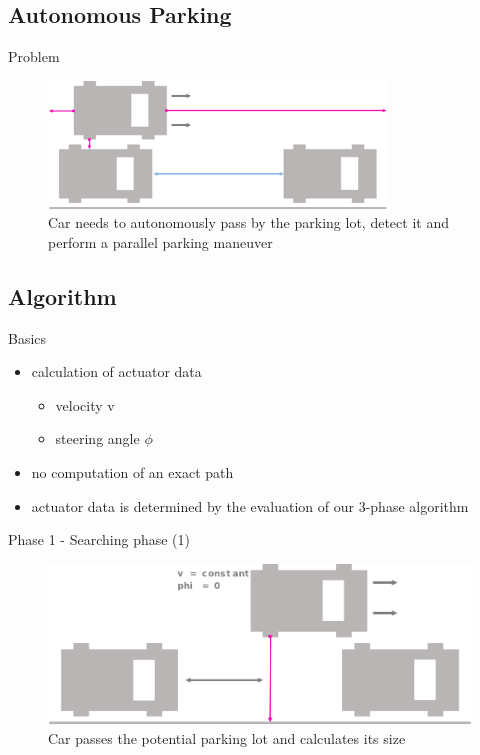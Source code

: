\documentclass[aspectratio=169]{beamer}
\begin{document}
  \subsection{Autonomous Parking}
  \begin{frame}{Problem}
  	\begin{figure} [ht]
  		\centering
  		\includegraphics[width=0.8\textwidth]{david_images/Problem.png}
  		\caption{\tiny Car needs to autonomously pass by the parking lot, detect it and perform a parallel parking maneuver}
	\end{figure}
  \end{frame}
  
  \subsection{Algorithm}
  \begin{frame}{Basics}
  	\begin{itemize}
  	\item<1-> calculation of actuator data
  		\begin{itemize}
  		 \item<2-> velocity v
  		 \item<3-> steering angle $\phi$
  		\end{itemize}
  	\item<4-> no computation of an exact path
  	\item<5-> actuator data is determined by the evaluation of our 3-phase algorithm
  	\end{itemize}
  \end{frame}
   
  \begin{frame}{Phase 1 - Searching phase (1)}
  	\begin{figure} [ht]
  		\centering
  		\includegraphics[width=1.0\textwidth]{david_images/FindLot1.png}
  		\caption{\tiny Car passes the potential parking lot and calculates its size}
	\end{figure}
  \end{frame}
  
\end{document}
